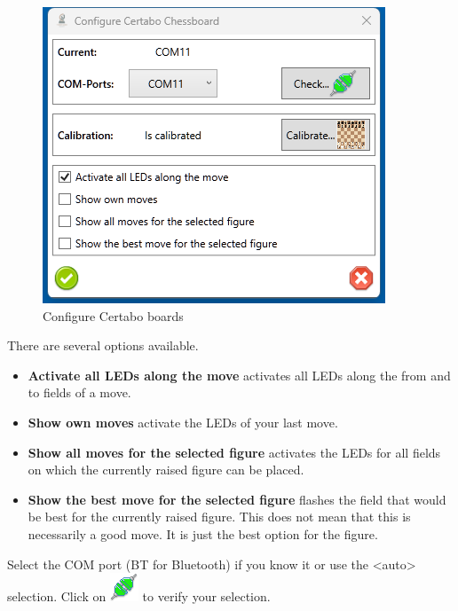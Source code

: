 \documentclass[11pt,a4paper]{article}
\begin{document}
\begin{figure}[H]
	\centering
	\includegraphics[scale=1.0]{Certabo2.png}
	\caption{Configure Certabo boards }
	\label{fig:Certabo2}
\end{figure}

There are several options available.
\begin{itemize}
	\item \textbf{Activate all LEDs along the move} activates all LEDs along the from and to fields of a move.
	\item \textbf{Show own moves} activate the LEDs of your last move.
	\item \textbf{Show all moves for the selected figure} activates the LEDs for all fields on which the currently raised figure can be placed.
	\item \textbf{Show the best move for the selected figure} flashes the field that would be best for the currently raised figure. This does not mean that this is necessarily a good move. It is just the best option for the figure.
\end{itemize}


Select the COM port (BT for Bluetooth) if you know it or use the <auto> selection. 
Click on \includegraphics[scale=0.5]{connect.png} to verify your selection.
\end{document}
